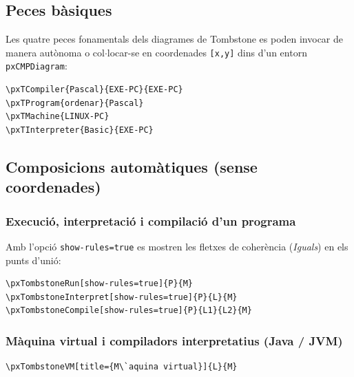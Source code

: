 \documentclass[11pt,a4paper]{article}
\begin{document}
\subsection{Peces b\`asiques}
Les quatre peces fonamentals dels diagrames de Tombstone es poden invocar de manera
aut\`onoma o col$\cdot$locar-se en coordenades \texttt{[x,y]} dins d'un entorn \texttt{pxCMPDiagram}:

\begin{verbatim}
\pxTCompiler{Pascal}{EXE-PC}{EXE-PC}
\pxTProgram{ordenar}{Pascal}
\pxTMachine{LINUX-PC}
\pxTInterpreter{Basic}{EXE-PC}
\end{verbatim}

\quad
{}\quad
{}\quad
{}

\subsection{Composicions autom\`atiques (sense coordenades)}

\subsubsection*{Execuci\'o, interpretaci\'o i compilaci\'o d'un programa}
Amb l'opci\'o \texttt{show-rules=true} es mostren les fletxes de coher\`encia (\emph{Iguals})
en els punts d'uni\'o:

\begin{verbatim}
\pxTombstoneRun[show-rules=true]{P}{M}
\pxTombstoneInterpret[show-rules=true]{P}{L}{M}
\pxTombstoneCompile[show-rules=true]{P}{L1}{L2}{M}
\end{verbatim}


\subsubsection*{M\`aquina virtual i compiladors interpretatius (Java / JVM)}
\begin{verbatim}
\pxTombstoneVM[title={M\`aquina virtual}]{L}{M}
\end{verbatim}
\end{document}
